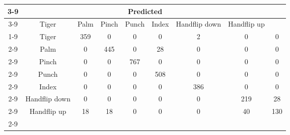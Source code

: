 \documentclass{standalone}
\begin{document}
 
 \begin{tabular}{|c |c |c |c |c |c |c |c |c |}
\cline{3-9}\multicolumn{2}{c|}{} & \multicolumn{7}{c|}{Predicted} \\ 
\cline{3-9} \multicolumn{2}{c |}{ } & Tiger & Palm & Pinch & Punch & Index & Handflip down & Handflip up\\ 
\cline{1-9}\multirow{7}{*}{\rotatebox[origin=c]{90}{Actual}} & Tiger & 359 & 0 & 0 & 0 & 2 & 0 & 0\\ 
 \cline{2-9} & Palm & 0 & 445 & 0 & 28 & 0 & 0 & 0\\ 
 \cline{2-9} & Pinch & 0 & 0 & 767 & 0 & 0 & 0 & 0\\ 
 \cline{2-9} & Punch & 0 & 0 & 0 & 508 & 0 & 0 & 0\\ 
 \cline{2-9} & Index & 0 & 0 & 0 & 0 & 386 & 0 & 0\\ 
 \cline{2-9} & Handflip down & 0 & 0 & 0 & 0 & 0 & 219 & 28\\ 
 \cline{2-9} & Handflip up & 18 & 18 & 0 & 0 & 0 & 40 & 130\\ 
 \cline{2-9}\hline \end{tabular}
 
\end{document}
